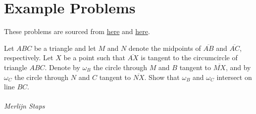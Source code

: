 \documentclass{article}
\theoremstyle{mytheoremstyle}
\theoremstyle{mytheoremstyle}
\theoremstyle{myproblemstyle}
\begin{document}
    \section{Example Problems}
    These problems are sourced from \href{https://artofproblemsolving.com/community/c473124h1763266_moving_points_tutorial}{here} and \href{https://static1.squarespace.com/static/5fe101b108d85d5e817a934a/t/62b49688bfd3de63fa3c131b/1656002210249/The_Method_of_Moving_Points_Norra_Real.pdf}{here}.

    \begin{problem}
        Let $ABC$ be a triangle and let $M$ and $N$ denote the midpoints of $\overline{AB}$ and $\overline{AC}$, respectively. Let $X$ be a point such that $\overline{AX}$ is tangent to the circumcircle of triangle $ABC$. Denote by $\omega_B$ the circle through $M$ and $B$ tangent to $\overline{MX}$, and by $\omega_C$ the circle through $N$ and $C$ tangent to $\overline{NX}$. Show that $\omega_B$ and $\omega_C$ intersect on line $BC$. \\\\
        \textit{Merlijn Staps}
    \end{problem}

    
\end{document}
